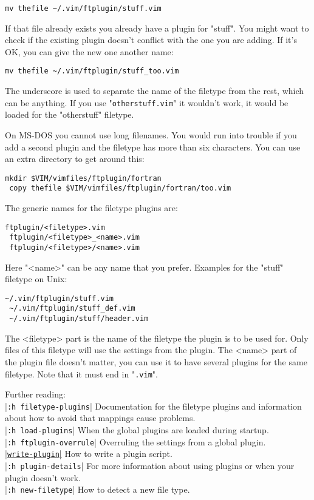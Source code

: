  \begin{Verbatim}[samepage=true]
 mv thefile ~/.vim/ftplugin/stuff.vim
 \end{Verbatim}

If that file already exists you already have a plugin for "stuff".
You might want to check if the existing plugin doesn't conflict with the one you are adding.
If it's OK, you can give the new one another name:

 \begin{Verbatim}[samepage=true]
 mv thefile ~/.vim/ftplugin/stuff_too.vim
 \end{Verbatim}

The underscore is used to separate the name of the filetype from the rest, which can be anything.
If you use "\verb!otherstuff.vim!" it wouldn't work, it would be loaded for the "otherstuff" filetype.

On MS-DOS you cannot use long filenames.
You would run into trouble if you add a second plugin and the filetype has more than six characters.
You can use an extra directory to get around this:

 \begin{Verbatim}[samepage=true]
 mkdir $VIM/vimfiles/ftplugin/fortran
 copy thefile $VIM/vimfiles/ftplugin/fortran/too.vim
 \end{Verbatim}

The generic names for the filetype plugins are:

 \begin{Verbatim}[samepage=true]
 ftplugin/<filetype>.vim
 ftplugin/<filetype>_<name>.vim
 ftplugin/<filetype>/<name>.vim
 \end{Verbatim}

Here "<name>" can be any name that you prefer.
Examples for the "stuff" filetype on Unix:

 \begin{Verbatim}[samepage=true]
 ~/.vim/ftplugin/stuff.vim
 ~/.vim/ftplugin/stuff_def.vim
 ~/.vim/ftplugin/stuff/header.vim
 \end{Verbatim}

The <filetype> part is the name of the filetype the plugin is to be used for.
Only files of this filetype will use the settings from the plugin.
The <name> part of the plugin file doesn't matter, you can use it to have several plugins for the same filetype.
Note that it must end in "\verb!.vim!".

Further reading:\\ %
|\verb!:h filetype-plugins!| Documentation for the filetype plugins and information about how to avoid that mappings cause problems.\\
|\verb!:h load-plugins!|     When the global plugins are loaded during startup.\\
|\verb!:h ftplugin-overrule!|   Overruling the settings from a global plugin.\\
\hyperref[write-plugin]{|\texttt{write-plugin}|}       How to write a plugin script.\\
|\verb!:h plugin-details!| For more information about using plugins or when your plugin doesn't work.\\
|\verb!:h new-filetype!|     How to detect a new file type.

